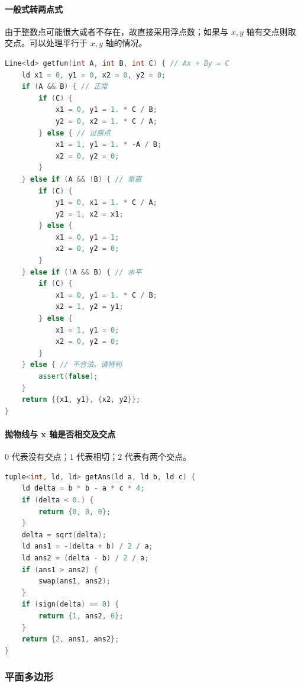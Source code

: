 \hypertarget{ux4e00ux822cux5f0fux8f6cux4e24ux70b9ux5f0f}{%
\paragraph{一般式转两点式}\label{ux4e00ux822cux5f0fux8f6cux4e24ux70b9ux5f0f}}

由于整数点可能很大或者不存在，故直接采用浮点数；如果与 \(x,y\) 轴有交点则取交点。可以处理平行于 \(x,y\) 轴的情况。

\begin{lstlisting}[language={C++}]
Line<ld> getfun(int A, int B, int C) { // Ax + By = C
    ld x1 = 0, y1 = 0, x2 = 0, y2 = 0;
    if (A && B) { // 正常
        if (C) {
            x1 = 0, y1 = 1. * C / B;
            y2 = 0, x2 = 1. * C / A;
        } else { // 过原点
            x1 = 1, y1 = 1. * -A / B;
            x2 = 0, y2 = 0;
        }
    } else if (A && !B) { // 垂直
        if (C) {
            y1 = 0, x1 = 1. * C / A;
            y2 = 1, x2 = x1;
        } else {
            x1 = 0, y1 = 1;
            x2 = 0, y2 = 0;
        }
    } else if (!A && B) { // 水平
        if (C) {
            x1 = 0, y1 = 1. * C / B;
            x2 = 1, y2 = y1;
        } else {
            x1 = 1, y1 = 0;
            x2 = 0, y2 = 0;
        }
    } else { // 不合法，请特判
        assert(false);
    }
    return {{x1, y1}, {x2, y2}};
}
\end{lstlisting}

\hypertarget{ux629bux7269ux7ebfux4e0e-x-ux8f74ux662fux5426ux76f8ux4ea4ux53caux4ea4ux70b9}{%
\paragraph{抛物线与 x 轴是否相交及交点}\label{ux629bux7269ux7ebfux4e0e-x-ux8f74ux662fux5426ux76f8ux4ea4ux53caux4ea4ux70b9}}

\(0\) 代表没有交点；\(1\) 代表相切；\(2\) 代表有两个交点。

\begin{lstlisting}[language={C++}]
tuple<int, ld, ld> getAns(ld a, ld b, ld c) {
    ld delta = b * b - a * c * 4;
    if (delta < 0.) {
        return {0, 0, 0};
    }
    delta = sqrt(delta);
    ld ans1 = -(delta + b) / 2 / a;
    ld ans2 = (delta - b) / 2 / a;
    if (ans1 > ans2) {
        swap(ans1, ans2);
    }
    if (sign(delta) == 0) {
        return {1, ans2, 0};
    }
    return {2, ans1, ans2};
}
\end{lstlisting}

\hypertarget{ux5e73ux9762ux591aux8fb9ux5f62}{%
\subsubsection{平面多边形}\label{ux5e73ux9762ux591aux8fb9ux5f62}}

